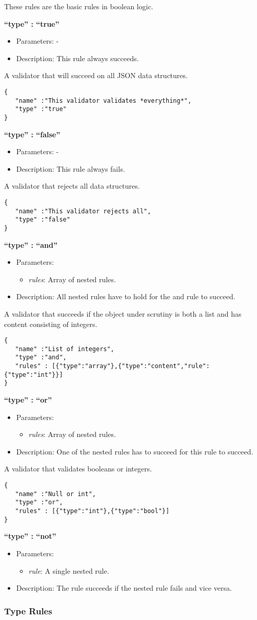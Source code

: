 \documentclass[a4paper]{article}
\newcommand{\ruledef}[3]{
\medskip
\textbf{#1}

\begin{itemize}
\setlength{\itemsep}{1pt}
\setlength{\parskip}{0pt}
\setlength{\parsep}{0pt}
   \item Parameters: #2
   \item Description: #3
\end{itemize}
}
\newcommand{\rulename}[1]{\textbf{``type'' : ``#1''}}
\newcommand{\param}[1]{\textsl{#1}:}
\begin{document}
These rules are the basic rules in boolean logic. 

\ruledef{\rulename{true}}{-}{This rule always succeeds.}

A validator that will succeed on all JSON data structures.	
\begin{lstlisting}
{
   "name" :"This validator validates *everything*",
   "type" :"true"
}
\end{lstlisting}

\ruledef{\rulename{false}}{-}{This rule always fails.}

A validator that rejects all data structures.
\begin{lstlisting}
{
   "name" :"This validator rejects all",
   "type" :"false"
}
\end{lstlisting}

\label{and}
\ruledef{\rulename{and}}{\begin{itemize} \item \param{rules} Array of nested rules. \end{itemize}}{All nested rules have to hold for the and rule to succeed.}

A validator that succeeds if the object under scrutiny is both a list and has content consisting of integers.
\begin{lstlisting}
{
   "name" :"List of integers",
   "type" :"and",
   "rules" : [{"type":"array"},{"type":"content","rule":{"type":"int"}}]
}
\end{lstlisting}

\ruledef{\rulename{or}}{\begin{itemize} \item \param{rules} Array of nested rules.\end{itemize}}{One of the nested rules has to succeed for this rule to succeed.}

A validator that validates booleans or integers.
\begin{lstlisting}
{
   "name" :"Null or int",
   "type" :"or",
   "rules" : [{"type":"int"},{"type":"bool"}]
}
\end{lstlisting}

\ruledef{\rulename{not}}{\begin{itemize} \item \param{rule} A single nested rule. \end{itemize}}{The rule succeeds if the nested rule fails and vice versa.}

\subsubsection{Type Rules }
\end{document}
